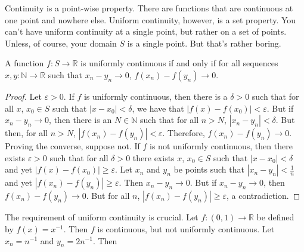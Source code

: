             Continuity is a point-wise property. There are
            functions that are continuous at one point
            and nowhere else. Uniform continuity, however,
            is a set property. You can't have uniform
            continuity at a single point,
            but rather on a set of points. Unless, of course,
            your domain $S$ is a single point. But that's rather boring.
            \begin{theorem}
                \label{thm:Funct:equiv_def_of_uni_cont}
                A function $f:S\rightarrow\mathbb{R}$
                is uniformly continuous if and only if
                for all sequences $x,y:\mathbb{N}\rightarrow\mathbb{R}$
                such that $x_{n}-y_{n}\rightarrow{0}$,
                $f(x_{n})-f(y_{n})\rightarrow{0}$.
            \end{theorem}
            \begin{proof}
                Let $\varepsilon>0$. If $f$ is uniformly continuous,
                then there is a $\delta>0$ such that for all
                $x$, $x_{0}\in{S}$ such that $|x-x_{0}|<\delta$,
                we have that $|f(x)-f(x_{0})|<\varepsilon$. But if
                $x_{n}-y_{n}\rightarrow{0}$, then there is an
                $N\in\mathbb{N}$ such that for all $n>N$,
                $|x_{n}-y_{n}|<\delta$. But then, for all $n>N$,
                $|f(x_{n})-f(y_{n})|<\varepsilon$. Therefore,
                $f(x_{n})-f(y_{n})\rightarrow{0}$. Proving the
                converse, suppose not. If $f$ is not uniformly
                continuous, then there exists $\varepsilon>0$
                such that for all $\delta>0$ there exists
                $x$, $x_{0}\in{S}$ such that
                $|x-x_{0}|<\delta$ and yet
                $|f(x)-f(x_{0})|\geq{\varepsilon}$. Let
                $x_{n}$ and $y_{n}$ be points such that
                $|x_{n}-y_{n}|<\frac{1}{n}$ and yet
                $|f(x_{n})-f(y_{n})|\geq\varepsilon$. Then
                $x_{n}-y_{n}\rightarrow{0}$. But if
                $x_{n}-y_{n}\rightarrow{0}$, then
                $f(x_{n})-f(y_{n})\rightarrow{0}$. But for all
                $n$, $|f(x_{n})-f(y_{n})|\geq{\varepsilon}$,
                a contradiction.
            \end{proof}
            The requirement of uniform continuity is crucial.
            Let $f:(0,1)\rightarrow\mathbb{R}$ be defined by
            $f(x)=x^{-1}$. Then $f$ is continuous, but
            not uniformly continuous. Let $x_{n}=n^{-1}$
            and $y_{n}=2n^{-1}$. Then
